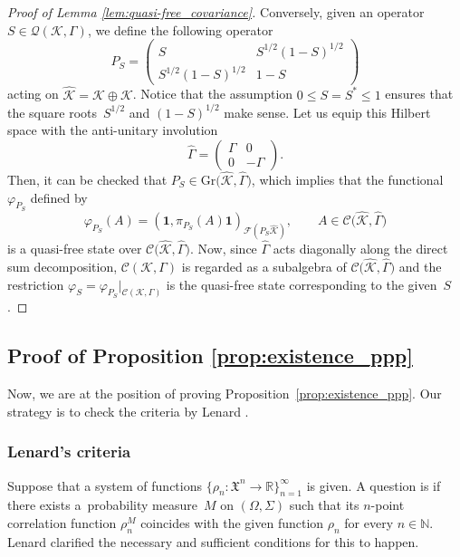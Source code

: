 \documentclass[11pt]{article}
\numberwithin{equation}{section}
\numberwithin{equation}{section}
\newcommand{\mfrak}[1]{\mathfrak{#1}}
\newcommand{\mcal}[1]{\mathcal{#1}}
\newcommand{\mbb}[1]{\mathbb{#1}}
\newcommand{\mrm}[1]{\mathrm{#1}}
\newcommand{\what}[1]{\widehat{#1}}
\begin{document}
\begin{proof}[Proof of Lemma \ref{lem:quasi-free_covariance}]
Conversely, given an operator $S\in\mcal{Q}(\mcal{K},\Gamma)$, we define the following operator
\begin{equation*}
	P_{S}=\left(
	\begin{matrix}
	S & S^{1/2}(1-S)^{1/2} \\
	S^{1/2}(1-S)^{1/2} & 1-S
	\end{matrix}
	\right)
\end{equation*}
acting on $\what{\mcal{K}}=\mcal{K}\oplus\mcal{K}$. Notice that the assumption $0\le S=S^{\ast}\le 1$ ensures that the square roots~$S^{1/2}$ and $(1-S)^{1/2}$ make sense. Let us equip this Hilbert space with the anti-unitary involution
\begin{equation*}
	\what{\Gamma}=\left(
	\begin{matrix}
	\Gamma & 0 \\
	0 & -\Gamma
	\end{matrix}
	\right).
\end{equation*}
Then, it can be checked that $P_{S}\in \mrm{Gr}\big(\what{\mcal{K}},\what{\Gamma}\big)$, which implies that the functional $\varphi_{P_{S}}$ defined by
\begin{equation*}
	\varphi_{P_{S}}(A)= (\bm{1},\pi_{P_{S}}(A)\bm{1} )_{\mcal{F}(P_{S}\what{\mcal{K}})},\qquad A\in \mcal{C}\big(\what{\mcal{K}},\what{\Gamma}\big)
\end{equation*}
is a quasi-free state over $\mcal{C}\big(\what{\mcal{K}},\what{\Gamma}\big)$. Now, since $\what{\Gamma}$ acts diagonally along the direct sum decomposition, $\mcal{C}(\mcal{K},\Gamma)$ is regarded as a subalgebra of $\mcal{C}\big(\what{\mcal{K}},\what{\Gamma}\big)$ and the restriction $\varphi_{S}=\varphi_{P_{S}}|_{\mcal{C}(\mcal{K},\Gamma)}$ is the quasi-free state corresponding to the given~$S$.
\end{proof}

\subsection{Proof of Proposition \ref{prop:existence_ppp}}
Now, we are at the position of proving Proposition~\ref{prop:existence_ppp}.
Our strategy is to check the criteria by Lenard \cite{Lenard1975a, Lenard1975b}.

\subsubsection{Lenard's criteria}
Suppose that a system of functions $\big\{\rho_{n}\colon\mfrak{X}^{n}\to\mbb{R}\big\}_{n=1}^{\infty}$ is given.
A question is if there exists a~probability measure~$M$ on $(\Omega,\Sigma)$ such that its $n$-point correlation function $\rho^{M}_{n}$ coincides with the given function $\rho_{n}$ for every $n\in\mbb{N}$.
Lenard \cite{Lenard1975a, Lenard1975b} clarified the necessary and sufficient conditions for this to happen.
\end{document}
